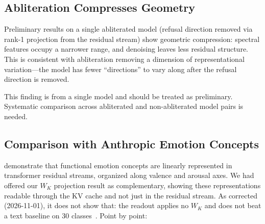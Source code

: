 \documentclass[11pt,a4paper]{article}
\begin{document}
\subsection{Abliteration Compresses Geometry}
\label{sec:abliteration}

Preliminary results on a single abliterated model (refusal direction removed
via rank-1 projection from the residual stream) show geometric compression:
spectral features occupy a narrower range, and denoising leaves less
residual structure. This is consistent with abliteration removing a dimension
of representational variation---the model has fewer ``directions'' to vary
along after the refusal direction is removed.

This finding is from a single model and should be treated as preliminary.
Systematic comparison across abliterated and non-abliterated model pairs
is needed.

\subsection{Comparison with Anthropic Emotion Concepts}
\label{sec:anthropic_comparison}

\citet{anthropic2026emotions} demonstrate that functional emotion concepts
are linearly represented in transformer residual streams, organized along
valence and arousal axes. We had offered our $W_K$ projection result as
complementary, showing these representations readable through the KV cache
and not just in the residual stream. As corrected (2026-11-01), it does not
show that: the readout applies no $W_K$ and does not beat a text baseline on
30 classes~\citep{lyra_p4}. Point by point:
\end{document}
